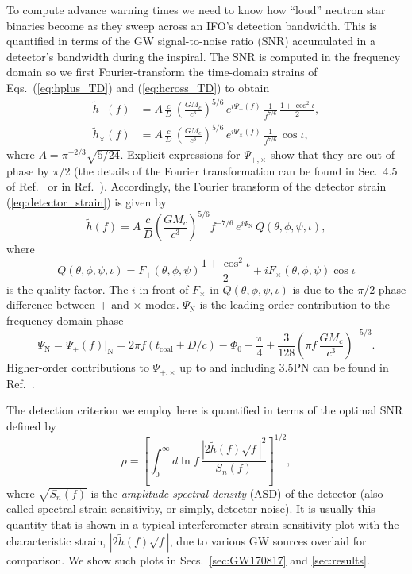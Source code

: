 \documentclass[prd,amsmath,amssymb,aps,floats,amsfonts,notitlepage,superscriptaddress,eqsecnum,nofootinbib,10pt]{revtex4-1}
\newcommand{\f}{\frac}
\newcommand{\be}{\begin{equation}}
\newcommand{\ee}{\end{equation}}
\begin{document}
To compute advance warning times we need to know how ``loud'' neutron star binaries become as they sweep across an IFO's detection bandwidth.
This is quantified in terms of the GW signal-to-noise ratio (SNR) accumulated in a detector's bandwidth during the inspiral.
The SNR is computed in the frequency domain so we first Fourier-transform the time-domain strains of Eqs.~(\ref{eq:hplus_TD}) and (\ref{eq:hcross_TD}) to obtain
%
\begin{align}
 \tilde{h}_+(f) &= A \, \f{c}{D}\, \left(\f{G M_c}{c^3}\right)^{5/6}\, e^{i \Psi_+(f)}\, \f{1}{f^{7/6}}\,  \f{1+\cos^2\iota}{2}  ,\label{eq:hplus_FD}\\
 \tilde{h}_\times(f) & = A \, \f{c}{D}\, \left(\f{G M_c}{c^3}\right)^{5/6}\, e^{i \Psi_\times(f)}\, \f{1}{f^{7/6}}\, \cos\iota \label{eq:hcross_FD},
\end{align}
%
%
where $A= \pi^{-2/3} \sqrt{5/24}$.
Explicit expressions for $\Psi_{+,\times}$ show that they are out of phase by $\pi/2$
(the details of the Fourier transformation can be found in Sec.~4.5 of Ref.~\cite{Maggiore} or in Ref.~\cite{Moore:2014lga}).
Accordingly, the Fourier transform of the detector strain (\ref{eq:detector_strain}) is given by
%
\be
\tilde{h}(f) = A\, \f{c}{D}\left(\f{G M_c}{c^3}\right)^{5/6} f^{-7/6}\, e^{i\Psi_\text{N}}\, Q(\theta,\phi,\psi,\iota), \label{eq:strain_FD}
\ee
%
where 
%
\be
Q(\theta,\phi,\psi,\iota) = F_+(\theta,\phi,\psi)\f{1+\cos^2\iota}{2}  + i F_\times(\theta,\phi,\psi) \cos\iota \label{eq:Q}
\ee
%
is the quality factor.
The $i$ in front of $F_\times$ in $Q(\theta,\phi,\psi,\iota)$ is due to the $\pi/2$ phase difference between $+$ and $\times$ modes.
$\Psi_\text{N}$ is the leading-order contribution to the frequency-domain phase
%
\be
\Psi_\text{N}=\Psi_+(f)|_\text{N} = 2\pi f (t_\text{coal}+D/c)-\Phi_0-\f{\pi}{4}+ \f{3}{128}\left(\pi f\,\f{G M_c}{c^3}\right)^{-5/3} \label{eq:phase_FD}.
\ee
%
%
Higher-order contributions to $\Psi_{+,\times}$ up to and including 3.5PN can be found in Ref.~\cite{SchutzLRR}.

The detection criterion we employ here is quantified in terms of the optimal SNR defined by
%
\be
\rho=\left[ \int_0^\infty d\ln f\, \f{|2\tilde{h}(f)\sqrt{f}|^2}{S_n(f)}\right]^{1/2} \label{eq:SNR},
\ee
%
where $\sqrt{S_n(f)}$ is the {\it amplitude spectral density} (ASD) of the detector (also called spectral strain sensitivity, or simply, detector noise).
It is usually this quantity that is shown in a typical interferometer strain sensitivity plot with the characteristic strain, $|2\tilde{h}(f)\sqrt{f}|$, 
due to various GW sources overlaid for comparison. 
%
We show such plots in Secs.~\ref{sec:GW170817} and \ref{sec:results}.
\end{document}
